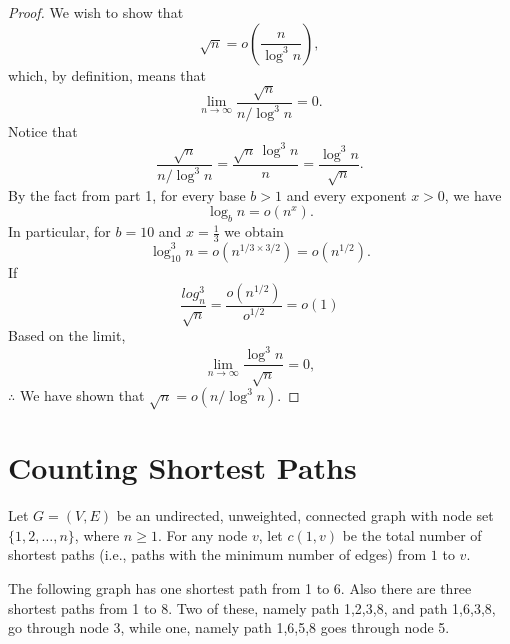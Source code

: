 \documentclass[11pt,fleqn]{exam}
\newenvironment{soln}{\color{solnblue}}{}
\newif\ifsolutions\solutionsfalse
\begin{document}
\begin{questions}
\begin{soln}
   \begin{proof}
      We wish to show that 
      \[
      \sqrt{n} = o\left(\frac{n}{\log^3 n}\right),
      \]
      which, by definition, means that
      \[
      \lim_{n \to \infty} \frac{\sqrt{n}}{n/\log^3 n} = 0.
      \]
      Notice that
      \[
      \frac{\sqrt{n}}{n/\log^3 n} = \frac{\sqrt{n}\,\log^3 n}{n} = \frac{\log^3 n}{\sqrt{n}}.
      \]
      By the fact from part 1, for every base \(b > 1\) and every exponent \(x > 0\), we have 
      \[
      \log_b n = o\left(n^x\right).
      \]
      In particular, for \(b = 10\) and \(x = \frac{1}{3}\) we obtain
      \[
      \log^3_{10} n = o\left(n^{1/3 \times 3/2}\right) = o\left(n^{1/2}\right).
      \]
      If 
      \[
         \frac{log^3_{n}}{\sqrt{n}} = \frac{o(n^{1/2})}{o^{1/2}} = o(1)
      \]
      Based on the limit,
      \[
      \lim_{n \rightarrow \infty} \frac{\log^3 n}{\sqrt{n}} = 0,
      \]
      $\therefore$ We have shown that $\sqrt{n} = o(n/\log^3 n)$.
   \end{proof}
\end{soln}



\ifsolutions
  
\fi
\end{questions}

\clearpage

\section{Counting Shortest Paths}

Let $G=(V,E)$ be an undirected, unweighted, connected graph with node set $\{1,2,\ldots,n\}$, where $n\ge 1$. For any node $v$, let $c(1,v)$ be the total number of shortest paths (i.e., paths with the minimum number of edges) from $1$ to $v$.

\vspace{.1in}

 The following graph has one shortest path from 1 to 6. Also there are three shortest paths from 1 to 8. Two of these,
namely path 1,2,3,8, and path 1,6,3,8, go through node 3, while one, namely path 1,6,5,8 goes through node 5.

\vspace{.1in}

\end{document}
